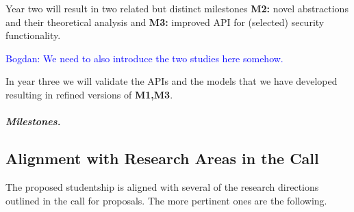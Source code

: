 \documentclass[10pt]{article}
\newcommand{\bw}[1]{{\textcolor{blue} {Bogdan: #1}}}
\begin{document}
\begin{description}
Year two will result in two related but distinct milestones \textbf{M2:} novel abstractions and their theoretical analysis and \textbf{M3:} improved API for (selected) security functionality. 

\bw{We need to also introduce the two studies here somehow.}

In year three we will validate the APIs and the models that we have developed resulting in refined versions of \textbf{M1,M3}.



\end{description}



\subparagraph{Milestones.}

















\subsection*{Alignment with Research Areas in the Call}

The proposed studentship is aligned with several of the research directions outlined in the call for proposals. The more pertinent ones are the following. 
\end{document}
